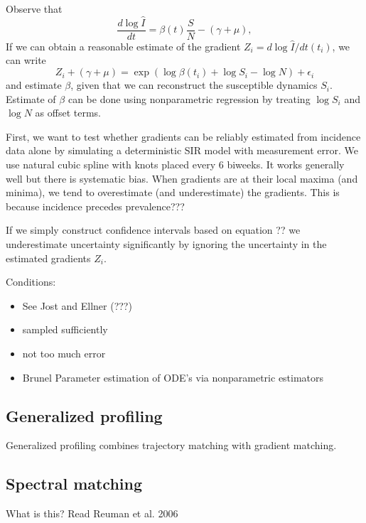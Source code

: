 \documentclass{article}
\begin{document}
Observe that
\begin{equation}
\frac{d \log\hat{I}}{dt} = \beta(t) \frac{S}{N} - (\gamma + \mu),
\end{equation}
If we can obtain a reasonable estimate of the gradient $Z_i = d \log \hat{I}/dt (t_i)$, we can write
\begin{equation}
Z_i + (\gamma + \mu) = \exp \left(\log \beta (t_i) + \log S_i - \log N \right)  + \epsilon_i
\end{equation}
and estimate $\beta$, given that we can reconstruct the susceptible dynamics $S_i$.
Estimate of $\beta$ can be done using nonparametric regression by treating $\log S_i$ and $\log N$ as offset terms.

First, we want to test whether gradients can be reliably estimated from incidence data alone by simulating a deterministic SIR model with measurement error.
We use natural cubic spline with knots placed every 6 biweeks.
It works generally well but there is systematic bias.
When gradients are at their local maxima (and minima), we tend to overestimate (and underestimate) the gradients.
This is because incidence precedes prevalence???

If we simply construct confidence intervals based on equation ?? we underestimate uncertainty significantly by ignoring the uncertainty in the estimated gradients $Z_i$.

Conditions:
\begin{itemize}
	\item See Jost and Ellner (???)
	\item sampled sufficiently
	\item not too much error
	\item Brunel Parameter estimation of ODE’s via nonparametric estimators
\end{itemize}



\subsection{Generalized profiling}

Generalized profiling combines trajectory matching with gradient matching.

\subsection{Spectral matching}

What is this? Read Reuman et al. 2006
\end{document}
